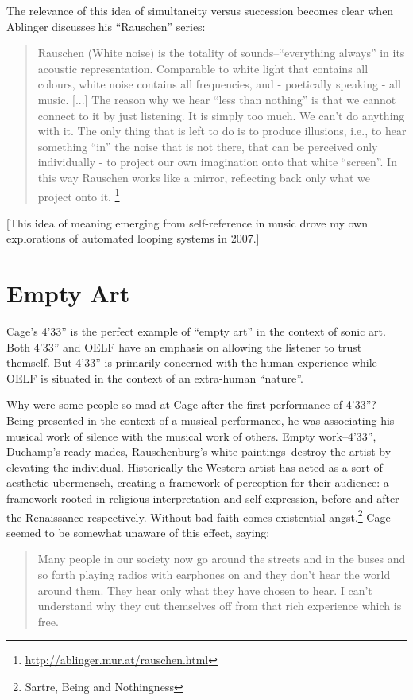 \documentclass{thesis}
\begin{document}
	The relevance of this idea of simultaneity versus succession becomes clear when Ablinger discusses his ``Rauschen'' series:
	
	\begin{quote}
	Rauschen (White noise) is the totality of sounds--``everything always'' in its acoustic representation. Comparable to white light that contains all colours, white noise contains all frequencies, and - poetically speaking - all music. [...] The reason why we hear ``less than nothing'' is that we cannot connect to it by just listening. It is simply too much. We can't do anything with it. The only thing that is left to do is to produce illusions, i.e., to hear something ``in'' the noise that is not there, that can be perceived only individually - to project our own imagination onto that white ``screen''. In this way Rauschen works like a mirror, reflecting back only what we project onto it. \footnote{\url{http://ablinger.mur.at/rauschen.html}}
	\end{quote}

	[This idea of meaning emerging from self-reference in music drove my own explorations of automated looping systems in 2007.]
	
\section{Empty Art}
	Cage's 4'33'' is the perfect example of ``empty art'' in the context of sonic art.\cite{larry_j_solomon_sounds_1998} Both 4'33'' and OELF have an emphasis on allowing the listener to trust themself. But 4'33'' is primarily concerned with the human experience while OELF is situated in the context of an extra-human ``nature''.
	
	Why were some people so mad at Cage after the first performance of 4'33''? Being presented in the context of a musical performance, he was associating his musical work of silence with the musical work of others. Empty work--4'33'', Duchamp's ready-mades, Rauschenburg's white paintings--destroy the artist by elevating the individual. Historically the Western artist has acted as a sort of aesthetic-ubermensch, creating a framework of perception for their audience: a framework rooted in religious interpretation and self-expression, before and after the Renaissance respectively. Without bad faith comes existential angst.\footnote{Sartre, Being and Nothingness} Cage seemed to be somewhat unaware of this effect, saying:
	
\begin{quote}
	Many people in our society now go around the streets and in the buses and so forth playing radios with earphones on and they don't hear the world around them. They hear only what they have chosen to hear. I can't understand why they cut themselves off from that rich experience which is free.
\end{quote}
\end{document}
